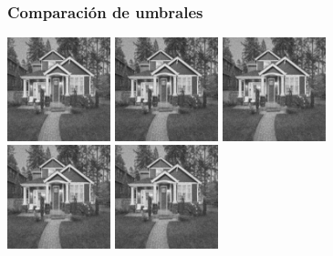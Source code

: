 \documentclass{beamer}
\begin{document}
  \begin{frame}
    \frametitle{ Comparación de umbrales }
  
    \centering
    \includegraphics[width=3cm]{imgs/Thresholds/2_awt_soft_sym8_House.jpg}
    \includegraphics[width=3cm]{imgs/Thresholds/2_normal_soft_sym8_House.jpg}
    \includegraphics[width=3cm]{imgs/Thresholds/2_universal_soft_sym8_House.jpg}
    \\
    \includegraphics[width=3cm]{imgs/Thresholds/2_bayes_soft_sym8_House.jpg}
    \includegraphics[width=3cm]{imgs/Thresholds/2_level_soft_sym8_House.jpg}
    

  \end{frame}
\end{document}
